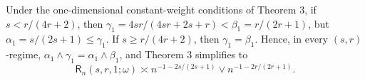 Under the one-dimensional constant-weight conditions of Theorem 3, if \(s<r/(4r+2)\), then \(\gamma_1=4sr/(4sr+2s+r)<\beta_1=r/(2r+1)\), but \(\alpha_1=s/(2s+1)\le\gamma_1\). If \(s\ge r/(4r+2)\), then \(\gamma_1=\beta_1\). Hence, in every \((s,r)\)-regime, \(\alpha_1\wedge\gamma_1=\alpha_1\wedge\beta_1\), and Theorem 3 simplifies to \[\mathsf R_n(s,r,1;\omega)\asymp n^{-1-2s/(2s+1)}\vee n^{-1-2r/(2r+1)}.\]
